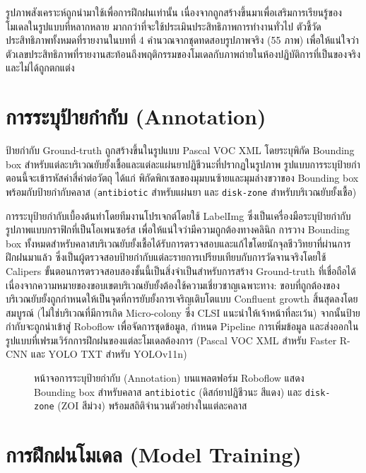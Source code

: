 รูปภาพสังเคราะห์ถูกนำมาใช้เพื่อการฝึกฝนเท่านั้น เนื่องจากถูกสร้างขึ้นมาเพื่อเสริมการเรียนรู้ของโมเดลในรูปแบบที่หลากหลาย มากกว่าที่จะใช้ประเมินประสิทธิภาพการทำงานทั่วไป ตัวชี้วัดประสิทธิภาพทั้งหมดที่รายงานในบทที่ 4 คำนวณจากชุดทดสอบรูปภาพจริง (55 ภาพ) เพื่อให้แน่ใจว่าตัวเลขประสิทธิภาพที่รายงานสะท้อนถึงพฤติกรรมของโมเดลกับภาพถ่ายในห้องปฏิบัติการที่เป็นของจริงและไม่ได้ถูกตกแต่ง

\section{การระบุป้ายกำกับ (Annotation)}

ป้ายกำกับ Ground-truth ถูกสร้างขึ้นในรูปแบบ Pascal VOC XML โดยระบุพิกัด Bounding box สำหรับแต่ละบริเวณยับยั้งเชื้อและแต่ละแผ่นยาปฏิชีวนะที่ปรากฏในรูปภาพ รูปแบบการระบุป้ายกำตอนนี้จะเข้ารหัสค่าสี่ค่าต่อวัตถุ ได้แก่ พิกัดพิกเซลของมุมบนซ้ายและมุมล่างขวาของ Bounding box พร้อมกับป้ายกำกับคลาส (\texttt{antibiotic} สำหรับแผ่นยา และ \texttt{disk-zone} สำหรับบริเวณยับยั้งเชื้อ)

การระบุป้ายกำกับเบื้องต้นทำโดยทีมงานโปรเจกต์โดยใช้ LabelImg \cite{labelimg} ซึ่งเป็นเครื่องมือระบุป้ายกำกับรูปภาพแบบกราฟิกที่เป็นโอเพนซอร์ส เพื่อให้แน่ใจว่ามีความถูกต้องทางคลินิก การวาง Bounding box ทั้งหมดสำหรับคลาสบริเวณยับยั้งเชื้อได้รับการตรวจสอบและแก้ไขโดยนักจุลชีววิทยาที่ผ่านการฝึกฝนมาแล้ว ซึ่งเป็นผู้ตรวจสอบป้ายกำกับแต่ละรายการเปรียบเทียบกับการวัดจานจริงโดยใช้ Calipers ขั้นตอนการตรวจสอบสองชั้นนี้เป็นสิ่งจำเป็นสำหรับการสร้าง Ground-truth ที่เชื่อถือได้ เนื่องจากความหมายของขอบเขตบริเวณยับยั้งต้องใช้ความเชี่ยวชาญเฉพาะทาง: ขอบที่ถูกต้องของบริเวณยับยั้งถูกกำหนดให้เป็นจุดที่การยับยั้งการเจริญเติบโตแบบ Confluent growth สิ้นสุดลงโดยสมบูรณ์ (ไม่ใช่บริเวณที่มีการเกิด Micro-colony ซึ่ง CLSI แนะนำให้เจ้าหน้าที่ละเว้น) จากนั้นป้ายกำกับจะถูกนำเข้าสู่ Roboflow เพื่อจัดการชุดข้อมูล, กำหนด Pipeline การเพิ่มข้อมูล และส่งออกในรูปแบบที่เฟรมเวิร์กการฝึกฝนของแต่ละโมเดลต้องการ (Pascal VOC XML สำหรับ Faster R-CNN และ YOLO TXT สำหรับ YOLOv11n)

\begin{figure}[H]
  \centering
  \caption{หน้าจอการระบุป้ายกำกับ (Annotation) บนแพลตฟอร์ม Roboflow แสดง Bounding box
    สำหรับคลาส \texttt{antibiotic} (ดิสก์ยาปฏิชีวนะ สีแดง) และ \texttt{disk-zone}
    (ZOI สีม่วง) พร้อมสถิติจำนวนตัวอย่างในแต่ละคลาส}
  \label{fig:annotation}
\end{figure}

\section{การฝึกฝนโมเดล (Model Training)}

